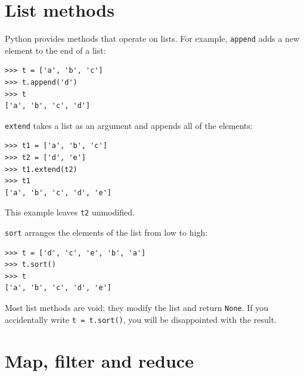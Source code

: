 \documentclass[10pt]{book}
\begin{document}

%

%


\section{List methods}

Python provides methods that operate on lists.  For example,
{\tt append} adds a new element to the end of a list:

\begin{verbatim}
>>> t = ['a', 'b', 'c']
>>> t.append('d')
>>> t
['a', 'b', 'c', 'd']
\end{verbatim}
%
{\tt extend} takes a list as an argument and appends all of
the elements:

\begin{verbatim}
>>> t1 = ['a', 'b', 'c']
>>> t2 = ['d', 'e']
>>> t1.extend(t2)
>>> t1
['a', 'b', 'c', 'd', 'e']
\end{verbatim}
%
This example leaves {\tt t2} unmodified.

{\tt sort} arranges the elements of the list from low to high:

\begin{verbatim}
>>> t = ['d', 'c', 'e', 'b', 'a']
>>> t.sort()
>>> t
['a', 'b', 'c', 'd', 'e']
\end{verbatim}
%
Most list methods are void; they modify the list and return {\tt None}.
If you accidentally write {\tt t = t.sort()}, you will be disappointed
with the result.


\section{Map, filter and reduce}
\label{filter}
\end{document}
